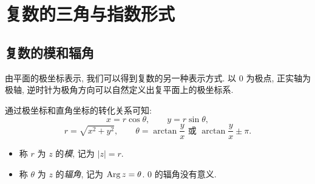 \section{复数的三角与指数形式}

\subsection{复数的模和辐角}

由平面的极坐标表示, 我们可以得到复数的另一种表示方式.
以 $0$ 为极点, 正实轴为极轴, 逆时针为极角方向可以自然定义出复平面上的极坐标系.

通过极坐标和直角坐标的转化关系可知:
\[ x=r\cos\theta,\qquad y=r\sin\theta,\]
\[r=\sqrt{x^2+y^2},\qquad \theta=\arctan\dfrac yx\text{ 或 }\arctan\dfrac yx\pm\pi.\]

\begin{definition}[模和辐角]
  \begin{itemize}
    \item 称 $r$ 为 $z$ 的\emph{模}, 记为 \emph{$|z|=r$}.
    \item 称 $\theta$ 为 $z$ 的\emph{辐角}, 记为 \emph{$\operatorname{Arg} z=\theta$}.
    \alert{$0$ 的辐角没有意义}.
  \end{itemize}
\end{definition}


